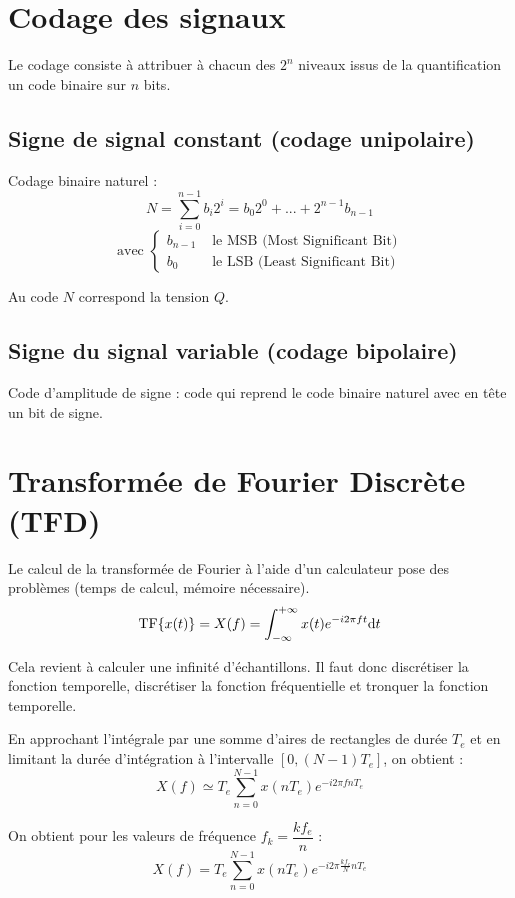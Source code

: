 \documentclass[a4paper,12pt]{report}
\begin{document}
\section{Codage des signaux}

Le codage consiste à attribuer à chacun des $2^n$ niveaux issus de la quantification un code binaire sur $n$ bits.

\subsection{Signe de signal constant (codage unipolaire)}

Codage binaire naturel :
\[ N = \sum_{i=0}^{n-1} b_i 2^i = b_0 2^0 + ... + 2^{n-1} b_{n-1} \]
\[ \text{avec } \begin{cases}
    b_{n-1} & \text{ le MSB (Most Significant Bit)} \\
    b_{0} & \text{ le LSB (Least Significant Bit)}
\end{cases} \]

Au code $N$ correspond la tension $Q$.

\subsection{Signe du signal variable (codage bipolaire)}

Code d'amplitude de signe : code qui reprend le code binaire naturel avec en tête un bit de signe.

\section{Transformée de Fourier Discrète (TFD)}

Le calcul de la transformée de Fourier à l'aide d'un calculateur pose des problèmes (temps de calcul, mémoire nécessaire).
\[ \mathrm{TF} \{ x(t) \} = X(f) = \int_{-\infty}^{+\infty} x(t) e^{-i2\pi ft} \mathrm{d}t \]

Cela revient à calculer une infinité d'échantillons. Il faut donc discrétiser la fonction temporelle, discrétiser la fonction fréquentielle et tronquer la fonction temporelle.

En approchant l'intégrale par une somme d'aires de rectangles de durée $T_e$ et en limitant la durée d'intégration à l'intervalle $[0, (N-1)T_e]$, on obtient :
\[ X(f) \simeq T_e \sum_{n=0}^{N-1} x(nT_e) e^{-i2\pi fnT_e} \]

On obtient pour les valeurs de fréquence $f_k = \dfrac{kf_e}{n}$ :
\[ X(f) = T_e \sum_{n=0}^{N-1} x(nT_e) e^{-i2\pi \frac{kf_e}{N} nT_e} \]
\end{document}
